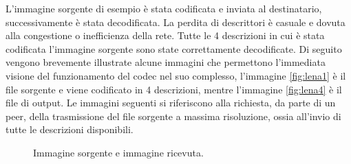 L'immagine sorgente di esempio è stata codificata e
inviata al destinatario, successivamente è stata decodificata. La perdita di descrittori è casuale e dovuta alla congestione o inefficienza della rete. Tutte le 4 descrizioni in cui è stata codificata
l'immagine sorgente sono state correttamente decodificate. Di seguito vengono
brevemente illustrate alcune immagini che permettono l'immediata visione del
funzionamento del codec nel suo complesso, l'immagine \ref{fig:lena1} è il file
sorgente e viene codificato in 4 descrizioni, mentre l'immagine \ref{fig:lena4}
è il file di output. Le immagini seguenti si riferiscono alla richiesta, da
parte di un peer, della trasmissione del file sorgente a massima risoluzione, ossia all'invio di tutte le descrizioni disponibili.

\begin{figure}[t]
\centering
{}
	\caption{Immagine sorgente e immagine ricevuta.}
\end{figure}

